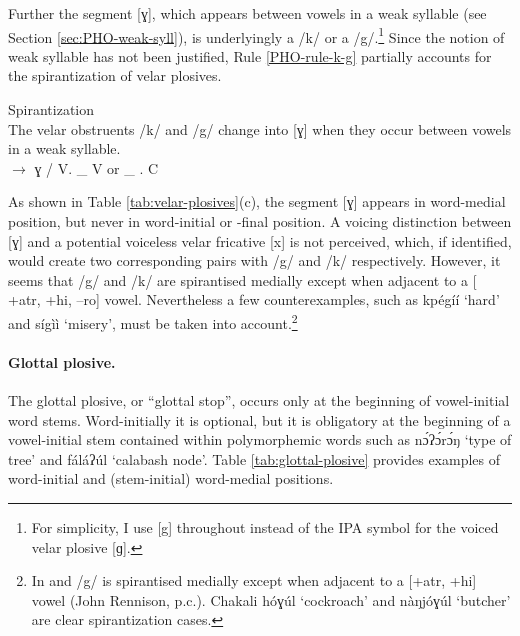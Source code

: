 Further the segment [ɣ], which appears 
between vowels in a weak syllable (see Section \ref{sec:PHO-weak-syll}),  is 
underlyingly a /k/ or a  /g/.\footnote{For simplicity, I use [g] throughout instead of the IPA symbol for the voiced velar plosive  [ɡ].} Since the notion of weak syllable 
has 
not been justified, Rule \ref{PHO-rule-k-g} partially accounts for the 
spirantization  of velar plosives.


\begin{Rule}\label{PHO-rule-k-g}{Spirantization}\\
The velar obstruents  /k/ and /g/  change into  [ɣ]  
when they occur
between vowels in a weak syllable.\\
{}  $\rightarrow$  ɣ  /  V. \_ V or  \_ . C
\end{Rule}


\largerpage[2]
As shown in Table \ref{tab:velar-plosives}(c), the segment [ɣ] appears 
in 
word-medial position, but never in word-initial or  -final position.  A  voicing 
distinction between [ɣ] and a potential voiceless velar fricative [x] is not perceived, which,  if identified, would create two corresponding 
pairs with /g/ and /k/ respectively. However, it seems that 
/g/ and /k/ are spirantised medially except when adjacent to a [{\sc 
+atr}, {\sc +hi}, {\sc --ro}] vowel. Nevertheless a few counterexamples, such as 
{\sls kpégíí} `hard' and {\sls sígìì} `misery',  must be taken into 
account.\footnote{In  and  /{g}/ is spirantised medially 
except when adjacent to a [{\sc +atr}, {\sc +hi}] vowel  (John Rennison, p.c.). 
Chakali  {\sls hóɣúl} `cockroach' and {\sls nàŋjóɣúl} `butcher'  are clear 
spirantization cases.}






\paragraph{Glottal plosive.}


The glottal plosive, or ``glottal stop'', occurs only at the beginning of vowel-initial word stems. 
Word-initially it is optional, but it is obligatory at the beginning of a 
vowel-initial stem contained within polymorphemic words such as  {\sls 
nɔ́ʔɔ́rɔ́ŋ} `type  of tree' and {\sls fáláʔúl}  `calabash node'. Table 
\ref{tab:glottal-plosive} provides examples of word-initial and (stem-initial) 
word-medial positions.

